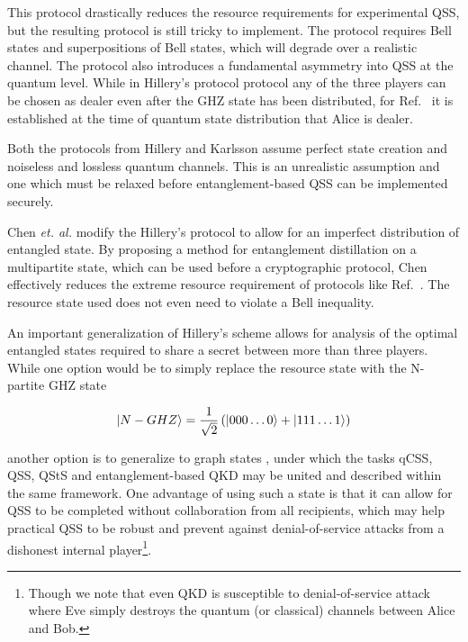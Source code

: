 This protocol drastically reduces the resource requirements for experimental QSS, but the resulting protocol is still tricky to implement. The protocol requires Bell states and superpositions of Bell states, which will degrade over a realistic channel.  The protocol also introduces a fundamental asymmetry into QSS at the quantum level. While in Hillery's protocol protocol any of the three players can be chosen as dealer even after the GHZ state has been distributed, for Ref.~\cite{Karlsson1999} it is established at the time of quantum state distribution that Alice is dealer. %

Both the protocols from Hillery \cite{Hillery1999} and Karlsson \cite{Karlsson1999} assume perfect state creation and noiseless and lossless quantum channels. This is an unrealistic assumption and one which must be relaxed before entanglement-based QSS can be implemented securely. 

Chen \emph{et. al.} \cite{Chen2005a} modify the Hillery's protocol \cite{Hillery1999} to allow for an imperfect distribution of entangled state. By proposing a method for entanglement distillation on a multipartite state, which can be used before a cryptographic protocol, Chen effectively reduces the extreme resource requirement of protocols like Ref.~\cite{Hillery1999}. The resource state used does not even need to violate a Bell inequality.

An important generalization of Hillery's scheme allows for analysis of the optimal entangled states required to share a secret between more than three players. While one option would be to simply replace the resource state with the N-partite GHZ state

\begin{equation}
\ket{N-GHZ} = \frac{1}{\sqrt{2}}\left(\ket{000\dots0} + \ket{111\dots1} \right)
\end{equation}

\noindent another option is to generalize to graph states \cite{Markham2008, Keet2010, Lau2013, Wu2016}, under which the tasks qCSS, QSS, QStS and entanglement-based QKD may be united and described within the same framework. %
One advantage of using such a state is that it can allow for QSS to be completed without collaboration from all recipients, which may help practical QSS to be robust and prevent against denial-of-service attacks from a dishonest internal player\footnote{Though we note that even QKD is susceptible to denial-of-service attack where Eve simply destroys the quantum (or classical) channels between Alice and Bob.}.

